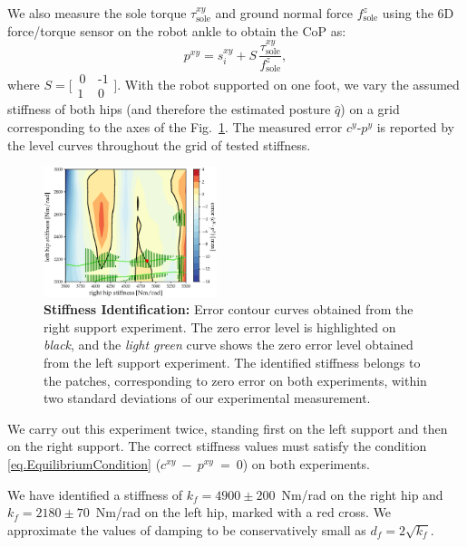 \documentclass[letterpaper, 10 pt, conference]{ieeeconf}  %
\begin{document}
We also measure the sole torque $\tau_\mathrm{sole}^{xy}$ and ground normal force $f_\mathrm{sole}^z$ using the 6D force/torque sensor on the robot ankle to obtain the CoP as:
\begin{equation}
    p^{xy} = s_i^{xy} + S\,\frac{\tau_\mathrm{sole}^{xy}}{f_\mathrm{sole}^z},
\end{equation}
%
where $ S=\big[\begin{smallmatrix}\,0\, & \texttt{-}1\\1\, &0 \end{smallmatrix}\big]$. 
%
With the robot supported on one foot, we vary the assumed stiffness of both hips (and therefore the estimated posture $\hat{q}$) on a grid corresponding to the axes of the Fig.~\ref{Fig:flex_id}. The measured error $c^{y}\texttt{-}p^{y}$ is reported by the level curves throughout the grid of tested stiffness.

\begin{figure}
	\centering
	\includegraphics[trim={0 0.5mm 0 3.5mm},clip,width=0.45\textwidth]{images/IdentificationDual.eps}
	\caption{\textbf{Stiffness Identification:} Error contour curves obtained from the right support experiment. The zero error level is highlighted on \textit{black}, and the \textit{light green} curve shows the zero error level obtained from the left support experiment. The identified stiffness belongs to the  patches, corresponding to zero error on both experiments, within two standard deviations of our experimental measurement.}
	\label{Fig:flex_id}
	\vspace{-3mm}
\end{figure} 


We carry out this experiment twice, standing first on the left support and then on the right support. The correct stiffness values must satisfy the condition \eqref{eq.EquilibriumCondition} ($c^{xy}\!~-~\!p^{xy}\!~=~\!0$) on both experiments.

We have identified a stiffness of $k_f = 4900 \pm 200$~Nm/rad on the right hip and $k_f = 2180 \pm 70$~Nm/rad on the left hip, marked with a red cross. We approximate the values of damping to be conservatively small as $d_f = 2\sqrt{k_f}$.
\end{document}
